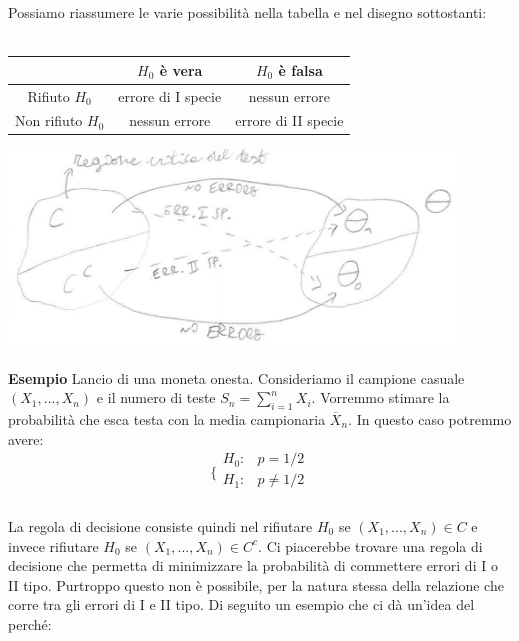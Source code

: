 Possiamo riassumere le varie possibilità nella tabella e nel disegno sottostanti:
\\
\\
\begin{center}
\begin{tabular}{c|c|c}
 & $H_0$ è vera & $H_0$ è falsa \\ 
\hline 
Rifiuto $H_0$ & errore di I specie & nessun errore \\ 
\hline 
Non rifiuto $H_0$ & nessun errore & errore di II specie \\ 
\end{tabular} 
\end{center}

\begin{center}
\includegraphics [width=12cm] {immagini/grafico_1.jpg}
\end{center}

\noindent \textbf{Esempio} Lancio di una moneta onesta. Consideriamo il campione casuale $(X_1,...,X_n)$ e il numero di teste $S_n = \sum_{i=1}^n X_i$. Vorremmo stimare la probabilità che esca testa con la media campionaria $\overline{X}_n$. In questo caso potremmo avere:
\\
$$\bigg \{
\begin{array}{rl}
H_0: & p=1/2 \\
H_1: & p \neq 1/2 \\
\end{array}
$$
\\
La regola di decisione consiste quindi nel rifiutare $H_0$ se $(X_1,...,X_n) \in C$ e invece rifiutare $H_0$ se $(X_1,...,X_n) \in C^c$. Ci piacerebbe trovare una regola di decisione che permetta di minimizzare la probabilità di commettere errori di I o II tipo. Purtroppo questo non è possibile, per la natura stessa della relazione che corre tra gli errori di I e II tipo. Di seguito un esempio che ci dà un'idea del perché:\\

